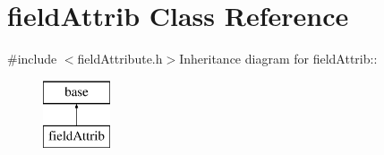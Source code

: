 \hypertarget{classfield_attrib}{
\section{fieldAttrib Class Reference}
\label{classfield_attrib}
}


{\ttfamily \#include $<$fieldAttribute.h$>$}Inheritance diagram for fieldAttrib::\begin{figure}[H]
\begin{center}
\leavevmode
\includegraphics[height=2cm]{classfield_attrib}
\end{center}
\end{figure}
